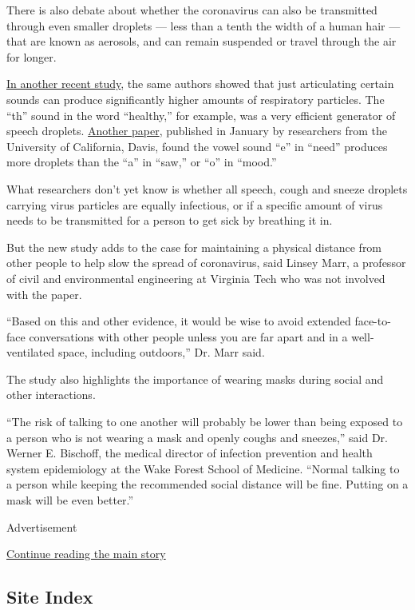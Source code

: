 There is also debate about whether the coronavirus can also be
transmitted through even smaller droplets --- less than a tenth the
width of a human hair --- that are known as aerosols, and can remain
suspended or travel through the air for longer.

\href{https://www.nejm.org/doi/full/10.1056/NEJMc2007800}{In another
recent study}, the same authors showed that just articulating certain
sounds can produce significantly higher amounts of respiratory
particles. The ``th'' sound in the word ``healthy,'' for example, was a
very efficient generator of speech droplets.
\href{https://journals.plos.org/plosone/article?id=10.1371/journal.pone.0227699}{Another
paper}, published in January by researchers from the University of
California, Davis, found the vowel sound ``e'' in ``need'' produces more
droplets than the ``a'' in ``saw,'' or ``o'' in ``mood.''

What researchers don't yet know is whether all speech, cough and sneeze
droplets carrying virus particles are equally infectious, or if a
specific amount of virus needs to be transmitted for a person to get
sick by breathing it in.

But the new study adds to the case for maintaining a physical distance
from other people to help slow the spread of coronavirus, said Linsey
Marr, a professor of civil and environmental engineering at Virginia
Tech who was not involved with the paper.

``Based on this and other evidence, it would be wise to avoid extended
face-to-face conversations with other people unless you are far apart
and in a well-ventilated space, including outdoors,'' Dr. Marr said.

The study also highlights the importance of wearing masks during social
and other interactions.

``The risk of talking to one another will probably be lower than being
exposed to a person who is not wearing a mask and openly coughs and
sneezes,'' said Dr. Werner E. Bischoff, the medical director of
infection prevention and health system epidemiology at the Wake Forest
School of Medicine. ``Normal talking to a person while keeping the
recommended social distance will be fine. Putting on a mask will be even
better.''

Advertisement

\protect\hyperlink{after-bottom}{Continue reading the main story}

\hypertarget{site-index}{%
\subsection{Site Index}\label{site-index}}

